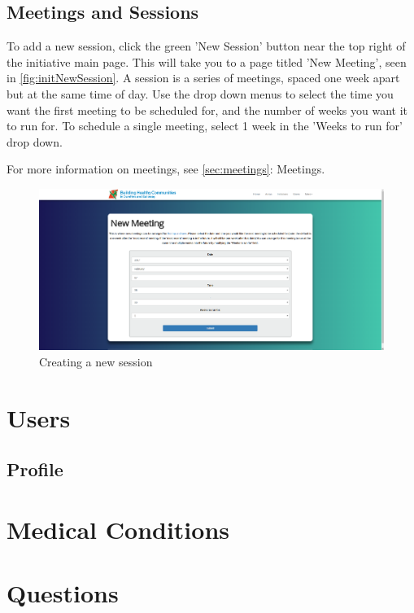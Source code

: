 \documentclass{bhcguides}
\begin{document}
\subsection{Meetings and Sessions}
\label{ssec:initmeets}

To add a new session, click the green 'New Session' button near the top right of the initiative main page. This will take you to a page titled 'New Meeting', seen in \autoref{fig:initNewSession}. A session is a series of meetings, spaced one week apart but at the same time of day. Use the drop down menus to select the time you want the first meeting to be scheduled for, and the number of weeks you want it to run for. To schedule a single meeting, select 1 week in the 'Weeks to run for' drop down.

For more information on meetings, see \autoref{sec:meetings}: Meetings.

\begin{figure}[h!]
 \centerline{\includegraphics[width=\textwidth, height=\textheight, keepaspectratio]{initnewsession.png}}
 \caption{Creating a new session}
 \label{fig:initNewSession}
\end{figure}

\section{Users}
\label{sec:users}

\subsection{Profile}
\label{ssec:profile}

\section{Medical Conditions}
\label{sec:medical}

\section{Questions}
\label{sec:questions}
\end{document}
